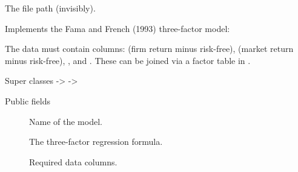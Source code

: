 \documentclass[a4paper]{book}
\begin{document}
%
\begin{Value}
The file path (invisibly).
\end{Value}
%
\begin{Description}
Implements the Fama and French (1993) three-factor model:

The data must contain columns:  (firm return minus risk-free),
 (market return minus risk-free), , and .
These can be joined via a factor table in .
\end{Description}
%
\begin{Section}{Super classes}
 ->  -> 
\end{Section}
%
\begin{Section}{Public fields}

\begin{description}

\item[] Name of the model.

\item[] The three-factor regression formula.

\item[] Required data columns.

\end{description}


\end{Section}
%
\end{document}
